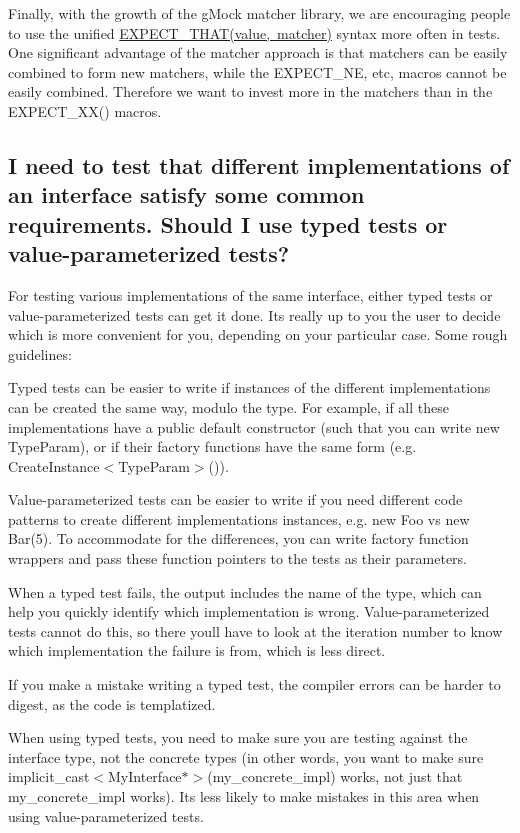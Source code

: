 Finally, with the growth of the g\+Mock matcher library, we are encouraging people to use the unified {\ttfamily \mbox{\hyperlink{_obj__test_2lib_2googletest-release-1_88_81_2googlemock_2include_2gmock_2gmock-matchers_8h_ac31e206123aa702e1152bb2735b31409}{E\+X\+P\+E\+C\+T\+\_\+\+T\+H\+A\+T(value, matcher)}}} syntax more often in tests. One significant advantage of the matcher approach is that matchers can be easily combined to form new matchers, while the {\ttfamily E\+X\+P\+E\+C\+T\+\_\+\+NE}, etc, macros cannot be easily combined. Therefore we want to invest more in the matchers than in the {\ttfamily E\+X\+P\+E\+C\+T\+\_\+\+X\+X()} macros.

\subsection*{I need to test that different implementations of an interface satisfy some common requirements. Should I use typed tests or value-\/parameterized tests?}

For testing various implementations of the same interface, either typed tests or value-\/parameterized tests can get it done. It\textquotesingle{}s really up to you the user to decide which is more convenient for you, depending on your particular case. Some rough guidelines\+:


\begin{DoxyItemize}
\item Typed tests can be easier to write if instances of the different implementations can be created the same way, modulo the type. For example, if all these implementations have a public default constructor (such that you can write {\ttfamily new Type\+Param}), or if their factory functions have the same form (e.\+g. {\ttfamily Create\+Instance$<$Type\+Param$>$()}).
\item Value-\/parameterized tests can be easier to write if you need different code patterns to create different implementations\textquotesingle{} instances, e.\+g. {\ttfamily new Foo} vs {\ttfamily new Bar(5)}. To accommodate for the differences, you can write factory function wrappers and pass these function pointers to the tests as their parameters.
\item When a typed test fails, the output includes the name of the type, which can help you quickly identify which implementation is wrong. Value-\/parameterized tests cannot do this, so there you\textquotesingle{}ll have to look at the iteration number to know which implementation the failure is from, which is less direct.
\item If you make a mistake writing a typed test, the compiler errors can be harder to digest, as the code is templatized.
\item When using typed tests, you need to make sure you are testing against the interface type, not the concrete types (in other words, you want to make sure {\ttfamily implicit\+\_\+cast$<$My\+Interface$\ast$$>$(my\+\_\+concrete\+\_\+impl)} works, not just that {\ttfamily my\+\_\+concrete\+\_\+impl} works). It\textquotesingle{}s less likely to make mistakes in this area when using value-\/parameterized tests.
\end{DoxyItemize}

